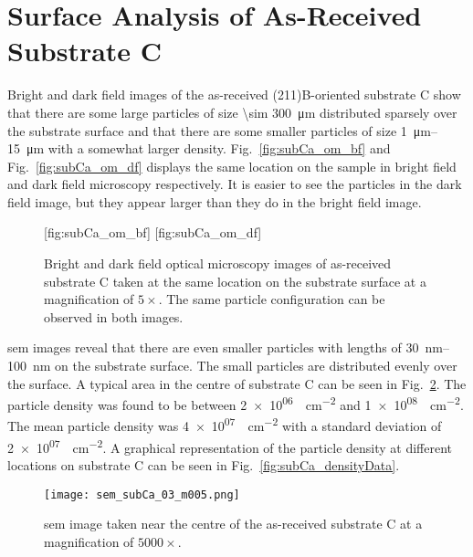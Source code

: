 \clearpage
\section{Surface Analysis of As-Received Substrate C}\label{sec:subCa}

Bright and dark field images of the as-received (211)B-oriented substrate C show that there are some large particles of size \SI{\sim 300}{\micro\metre} distributed sparsely over the substrate surface and that there are some smaller particles of size \SIrange{1}{15}{\micro\metre} with a somewhat larger density. Fig.~\ref{fig:subCa_om_bf} and Fig.~\ref{fig:subCa_om_df} displays the same location on the sample in bright field and dark field microscopy respectively. It is easier to see the particles in the dark field image, but they appear larger than they do in the bright field image.

\begin{figure}[htbp]
    \centering
    [fig:subCa_om_bf]
    [fig:subCa_om_df]
    \caption[Bright and dark field optical microscopy images of as-received substrate C.]{Bright and dark field optical microscopy images of as-received substrate C taken at the same location on the substrate surface at a magnification of $5\times$. The same particle configuration can be observed in both images.}
    \label{fig:subCa_om}
\end{figure}


\Ac{sem} images reveal that there are even smaller particles with lengths of \SIrange{30}{100}{\nano\metre} on the substrate surface. The small particles are distributed evenly over the surface. A typical area in the centre of substrate C can be seen in Fig.~\ref{fig:subCa_sem_area}. The particle density was found to be between \SI{2e+06}{\particle\centi\metre^{-2}} and \SI{1e+08}{\particle\centi\metre^{-2}}. The mean particle density was \SI{4e+07}{\particle\centi\metre^{-2}} with a standard deviation of \SI{2e+07}{\particle\centi\metre^{-2}}. A graphical representation of the particle density at different locations on substrate C can be seen in Fig.~\ref{fig:subCa_densityData}.

\begin{figure}[htbp]
    \centering
    \texttt{[image: sem\_subCa\_03\_m005.png]}
    \caption[\Ac{sem} image taken near the centre of the as-received substrate C.]{\Acf{sem} image taken near the centre of the as-received substrate C at a  magnification of $5000\times$.}
    \label{fig:subCa_sem_area}
\end{figure}

